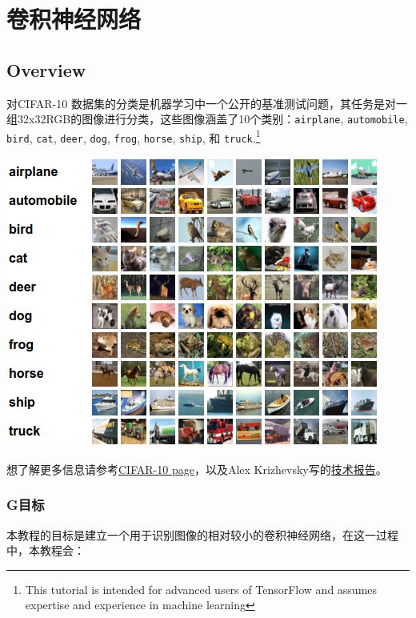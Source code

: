 



\newpage
\section {卷积神经网络} \label{cnn}

\subsection {Overview}


对CIFAR-10 数据集的分类是机器学习中一个公开的基准测试问题，其任务是对一组32x32RGB的图像进行分类，这些图像涵盖了10个类别：\lstinline{airplane}, \lstinline{automobile}, \lstinline{bird}, \lstinline{cat}, \lstinline{deer}, \lstinline{dog}, \lstinline{frog}, \lstinline{horse}, \lstinline{ship}, 和 \lstinline{truck}.\footnote{This tutorial is intended for advanced users of TensorFlow and assumes expertise and experience in machine learning}

\begin{center}
\includegraphics[width=.7\textwidth]{../SOURCE/images/cifar_samples.png}
\end{center}

想了解更多信息请参考\href{http://www.cs.toronto.edu/~kriz/cifar.html}{CIFAR-10 page}，以及Alex Krizhevsky写的\href{http://www.cs.toronto.edu/~kriz/learning-features-2009-TR.pdf}{技术报告}。

\subsubsection {G目标}
本教程的目标是建立一个用于识别图像的相对较小的卷积神经网络，在这一过程中，本教程会：

